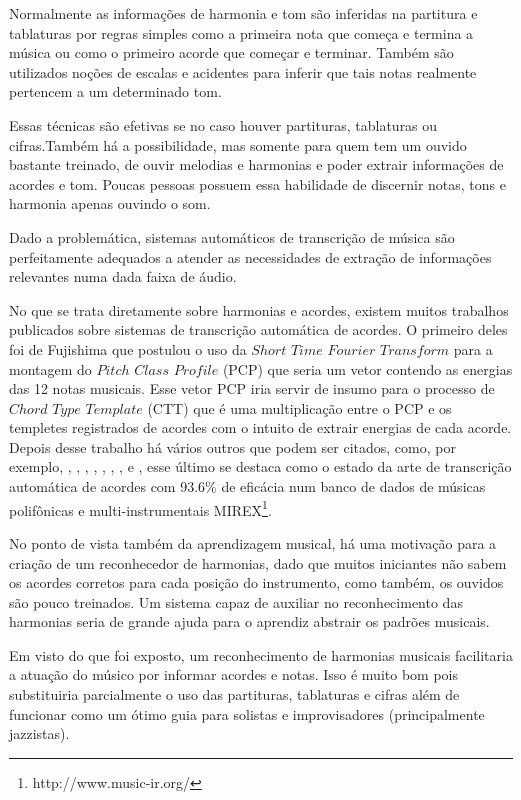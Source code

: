 Normalmente as informações de harmonia e tom são inferidas na partitura e tablaturas por regras simples como a primeira nota que começa e termina a música ou como o primeiro acorde que começar e terminar. Também são utilizados noções de escalas e acidentes para inferir que tais notas realmente pertencem a um determinado tom.

Essas técnicas são efetivas se no caso houver partituras, tablaturas ou cifras.Também há a possibilidade, mas somente para quem tem um ouvido bastante treinado, de ouvir melodias e harmonias e poder extrair informações de acordes e tom. Poucas pessoas possuem essa habilidade de discernir notas, tons e harmonia apenas ouvindo o som.

Dado a problemática, sistemas automáticos de transcrição de música \cite{automaticmusic} são perfeitamente adequados a atender as necessidades de extração de informações relevantes numa dada faixa de áudio.

No que se trata diretamente sobre harmonias e acordes, existem muitos trabalhos publicados sobre sistemas de transcrição automática de acordes. O primeiro deles foi de Fujishima \cite{fujishima1999realtime} que postulou o uso da $Short$ $Time$ $Fourier$ $Transform$ para a montagem do $Pitch$ $Class$ $Profile$ (PCP) que seria um vetor contendo as energias das 12 notas musicais. Esse vetor PCP iria servir de insumo para o processo de $Chord$ $Type$ $Template$ (CTT) que é uma multiplicação entre o PCP e os templetes registrados de acordes com o intuito de extrair energias de cada acorde. Depois desse trabalho há vários outros que podem ser citados, como, por exemplo, \cite{khadkevich2011time}, \cite{khadkevich2011time}, \cite{harte2010towards}, \cite{peeters2006chroma}, \cite{cho2010exploring}, \cite{lee2006automatic}, \cite{chen2012chord}, \cite{de2012improving} e \cite{boulanger2013audio}, esse último se destaca como o estado da arte de transcrição automática de acordes com 93.6\% de eficácia num banco de dados de músicas polifônicas e multi-instrumentais MIREX\footnote{http://www.music-ir.org/}. 

No ponto de vista também da aprendizagem musical, há uma motivação para a criação de um reconhecedor de harmonias, dado que muitos iniciantes não sabem os acordes corretos para cada posição do instrumento, como também, os ouvidos são pouco treinados. Um sistema capaz de auxiliar no reconhecimento das harmonias seria de grande ajuda para o aprendiz abstrair os padrões musicais.

Em visto do que foi exposto, um reconhecimento de harmonias musicais facilitaria a atuação do músico por informar acordes e notas. Isso é muito bom pois substituiria parcialmente o uso das partituras, tablaturas e cifras além de funcionar como um ótimo guia para solistas e improvisadores (principalmente jazzistas).

